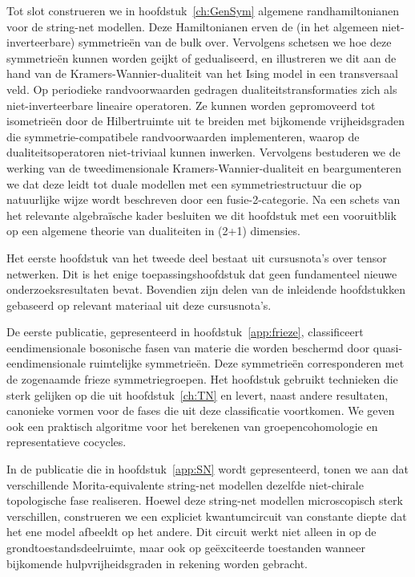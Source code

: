 Tot slot construeren we in hoofdstuk~\ref{ch:GenSym} algemene randhamiltonianen voor de string-net modellen. Deze Hamiltonianen erven de (in het algemeen niet-inverteerbare) symmetrie\"en van de bulk over. Vervolgens schetsen we hoe deze symmetrie\"en kunnen worden geijkt of gedualiseerd, en illustreren we dit aan de hand van de Kramers-Wannier-dualiteit van het Ising model in een transversaal veld. Op periodieke randvoorwaarden gedragen dualiteitstransformaties zich als niet-inverteerbare lineaire operatoren. Ze kunnen worden gepromoveerd tot isometrie\"en door de Hilbertruimte uit te breiden met bijkomende vrijheidsgraden die symmetrie-compatibele randvoorwaarden implementeren, waarop de dualiteitsoperatoren niet-triviaal kunnen inwerken. Vervolgens bestuderen we de werking van de tweedimensionale Kramers-Wannier-dualiteit en beargumenteren we dat deze leidt tot duale modellen met een symmetriestructuur die op natuurlijke wijze wordt beschreven door een fusie-2-categorie. Na een schets van het relevante algebra\"ische kader besluiten we dit hoofdstuk met een vooruitblik op een algemene theorie van dualiteiten in (2+1) dimensies.

Het eerste hoofdstuk van het tweede deel bestaat uit cursusnota's over tensor netwerken. Dit is het enige toepassingshoofdstuk dat geen fundamenteel nieuwe onderzoeksresultaten bevat. Bovendien zijn delen van de inleidende hoofdstukken gebaseerd op relevant materiaal uit deze cursusnota's.

De eerste publicatie, gepresenteerd in hoofdstuk~\ref{app:frieze}, classificeert eendimensionale bosonische fasen van materie die worden beschermd door quasi-eendimensionale ruimtelijke symmetrie\"en. Deze symmetrie\"en corresponderen met de zogenaamde frieze symmetriegroepen. Het hoofdstuk gebruikt technieken die sterk gelijken op die uit hoofdstuk~\ref{ch:TN} en levert, naast andere resultaten, canonieke vormen voor de fases die uit deze classificatie voortkomen. We geven ook een praktisch algoritme voor het berekenen van groepencohomologie en representatieve cocycles.

In de publicatie die in hoofdstuk~\ref{app:SN} wordt gepresenteerd, tonen we aan dat verschillende Morita-equivalente string-net modellen dezelfde niet-chirale topologische fase realiseren. Hoewel deze string-net modellen microscopisch sterk verschillen, construeren we een expliciet kwantumcircuit van constante diepte dat het ene model afbeeldt op het andere. Dit circuit werkt niet alleen in op de grondtoestandsdeelruimte, maar ook op ge\"exciteerde toestanden wanneer bijkomende hulpvrijheidsgraden in rekening worden gebracht.

